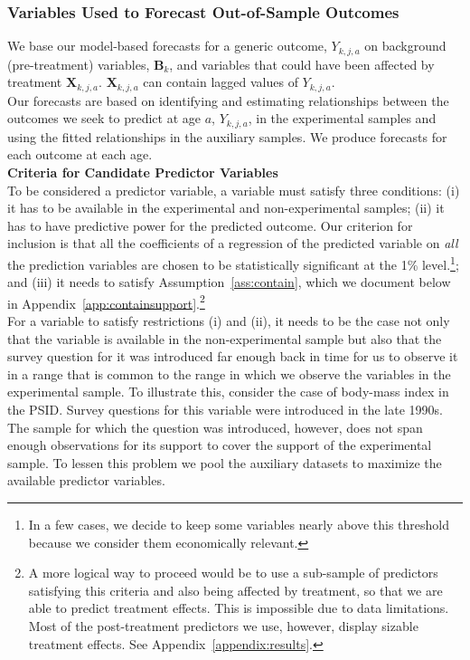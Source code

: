 \subsubsection{Variables Used to Forecast Out-of-Sample Outcomes} \label{appendix:pred}

We base our model-based forecasts for a generic outcome, $Y_{k,j,a}$ on background (pre-treatment) variables, $\bm{B}_k$, and variables that could have been affected by treatment $\bm{X}_{k,j,a}$. $\bm{X}_{k,j,a}$ can contain lagged values of $Y_{k,j,a}$.\\

\noindent Our forecasts are based on identifying and estimating relationships between the outcomes we seek to predict at age $a$, $Y_{k,j,a}$, in the experimental samples and using the fitted relationships in the auxiliary samples. We produce forecasts for each outcome at each age.\\

\noindent \textbf{Criteria for Candidate Predictor Variables}\\
\noindent To be considered a predictor variable, a variable must satisfy three conditions: (i) it has to be available in the experimental and non-experimental samples; (ii) it has to have predictive power for the predicted outcome. Our criterion for inclusion is that all the coefficients of a regression of the predicted variable on \textit{all} the prediction variables are chosen to be statistically significant at the 1\% level.\footnote{In a few cases, we decide to keep some variables nearly above this threshold because we consider them economically relevant.}; and (iii) it needs to satisfy Assumption~\ref{ass:contain}, which we document below in Appendix~\ref{app:containsupport}.\footnote{A more logical way to proceed would be to use a sub-sample of predictors satisfying this criteria and also being affected by treatment, so that we are able to predict treatment effects. This is impossible due to data limitations. Most of the post-treatment predictors we use, however, display sizable treatment effects. See Appendix~\ref{appendix:results}.}\\

\noindent For a variable to satisfy restrictions (i) and (ii), it needs to be the case not only that the variable is available in the non-experimental sample but also that the survey question for it was introduced far enough back in time for us to observe it in a range that is common to the range in which we observe the variables in the experimental sample. To illustrate this, consider the case of body-mass index in the PSID. Survey questions for this variable were introduced in the late 1990s. The sample for which the question was introduced, however, does not span enough observations for its support to cover the support of the experimental sample. To lessen this problem we pool the auxiliary datasets to maximize the available predictor variables.\\

